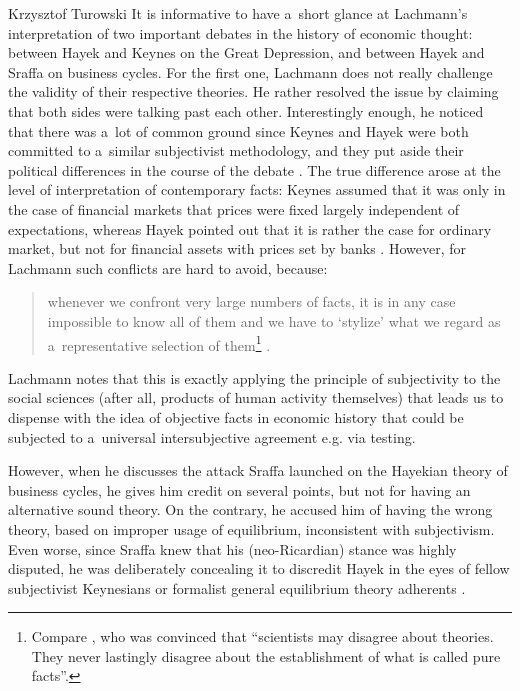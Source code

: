 \begin{artengenv}{Krzysztof Turowski}
It is informative to have a~short glance at Lachmann's interpretation of two important debates in the history of economic thought: between Hayek and Keynes on the Great Depression, and between Hayek and Sraffa on business cycles.
For the first one, Lachmann does not really challenge the validity of their respective theories. He rather resolved the issue by claiming that both sides were talking past each other. Interestingly enough, he noticed that there was a~lot of common ground since Keynes and Hayek were both committed to a~similar subjectivist methodology, and they put aside their political differences in the course of the debate \parencite[183]{lachmann-keynes}. The true difference arose at the level of interpretation of contemporary facts: Keynes assumed that it was only in the case of financial markets that prices were fixed largely independent of expectations, whereas Hayek pointed out that it is rather the case for ordinary market, but not for financial assets with prices set by banks \parencite[183--184]{lachmann-keynes}.
However, for Lachmann such conflicts are hard to avoid, because:
\begin{quote}
whenever we confront very large numbers of facts, it is in any case impossible to know all of them and we have to `stylize' what we regard as a~representative selection of them\footnote{Compare \textcite[304]{mises-theory}, who was convinced that ``scientists may disagree about theories. They never lastingly disagree about the establishment of what is called pure facts''.} \parencite[190]{lachmann-keynes}.
\end{quote}
Lachmann notes that this is exactly applying the principle of subjectivity to the social sciences (after all, products of human activity themselves) that leads us to dispense with the idea of objective facts in economic history that could be subjected to a~universal intersubjective agreement e.g. via testing.

However, when he discusses the attack Sraffa launched on the Hayekian theory of business cycles, he gives him credit on several points, but not for having an alternative sound theory. On the contrary, he accused him of having the wrong theory, based on improper usage of equilibrium, inconsistent with subjectivism.
Even worse, since Sraffa knew that his (neo-Ricardian) stance was highly disputed, he was deliberately concealing it to discredit Hayek in the eyes of fellow subjectivist Keynesians or formalist general equilibrium theory adherents \parencite[144--145]{lachmann-hayek-sraffa}.


\end{artengenv}
